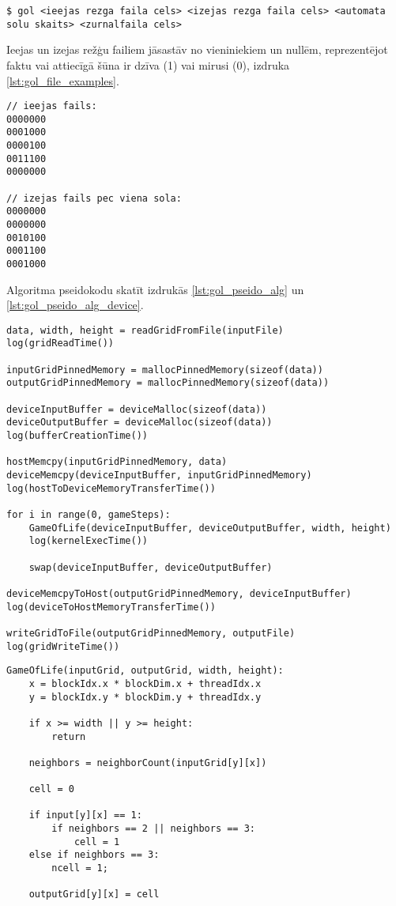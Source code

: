 \begin{lstlisting}[caption={Programmas galvenā izpilde}, label=lst:gol_mains]
$ gol <ieejas rezga faila cels> <izejas rezga faila cels> <automata solu skaits> <zurnalfaila cels> 
\end{lstlisting}

Ieejas un izejas režģu failiem jāsastāv no vieniniekiem un nullēm,
reprezentējot faktu vai attiecīgā šūna ir dzīva (1) vai mirusi (0), izdruka
\ref{lst:gol_file_examples}.

\begin{lstlisting}[caption={Ieejas, izejas faila piemērs (ar tā saukto planiera rakstu)}, label=lst:gol_file_examples]
// ieejas fails:
0000000
0001000
0000100
0011100
0000000

// izejas fails pec viena sola:
0000000
0000000
0010100
0001100
0001000
\end{lstlisting}

Algoritma pseidokodu skatīt izdrukās \ref{lst:gol_pseido_alg} un  \ref{lst:gol_pseido_alg_device}.
\begin{lstlisting}[caption={Dzīves spēles šūnu automāta CPU puses pseidokods}, label=lst:gol_pseido_alg]
data, width, height = readGridFromFile(inputFile)
log(gridReadTime())

inputGridPinnedMemory = mallocPinnedMemory(sizeof(data))
outputGridPinnedMemory = mallocPinnedMemory(sizeof(data))

deviceInputBuffer = deviceMalloc(sizeof(data))
deviceOutputBuffer = deviceMalloc(sizeof(data))
log(bufferCreationTime())

hostMemcpy(inputGridPinnedMemory, data)
deviceMemcpy(deviceInputBuffer, inputGridPinnedMemory)
log(hostToDeviceMemoryTransferTime())

for i in range(0, gameSteps):
    GameOfLife(deviceInputBuffer, deviceOutputBuffer, width, height)
    log(kernelExecTime())

    swap(deviceInputBuffer, deviceOutputBuffer)

deviceMemcpyToHost(outputGridPinnedMemory, deviceInputBuffer)
log(deviceToHostMemoryTransferTime())

writeGridToFile(outputGridPinnedMemory, outputFile)
log(gridWriteTime())
\end{lstlisting}

\begin{lstlisting}[caption={Dzīves spēles šūnu automāta GPGPU kodola pseidokods}, label=lst:gol_pseido_alg_device]
GameOfLife(inputGrid, outputGrid, width, height):
    x = blockIdx.x * blockDim.x + threadIdx.x
    y = blockIdx.y * blockDim.y + threadIdx.y

    if x >= width || y >= height:
        return

    neighbors = neighborCount(inputGrid[y][x])
    
    cell = 0

    if input[y][x] == 1:
		if neighbors == 2 || neighbors == 3:
		    cell = 1
	else if neighbors == 3:
        ncell = 1;

    outputGrid[y][x] = cell
\end{lstlisting}

